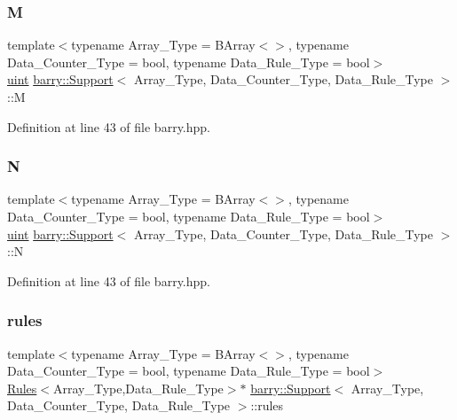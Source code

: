 \subsubsection{\texorpdfstring{M}{M}}
{\footnotesize\ttfamily template$<$typename Array\+\_\+\+Type  = B\+Array$<$$>$, typename Data\+\_\+\+Counter\+\_\+\+Type  = bool, typename Data\+\_\+\+Rule\+\_\+\+Type  = bool$>$ \\
\hyperlink{namespacebarry_a11dfc53ddb4672278319aa04f1e09a6c}{uint} \hyperlink{classbarry_1_1_support}{barry\+::\+Support}$<$ Array\+\_\+\+Type, Data\+\_\+\+Counter\+\_\+\+Type, Data\+\_\+\+Rule\+\_\+\+Type $>$\+::M}



Definition at line 43 of file barry.\+hpp.

\mbox{\label{classbarry_1_1_support_a776221deb92d113e5dee1cb100174ed4}} 
\subsubsection{\texorpdfstring{N}{N}}
{\footnotesize\ttfamily template$<$typename Array\+\_\+\+Type  = B\+Array$<$$>$, typename Data\+\_\+\+Counter\+\_\+\+Type  = bool, typename Data\+\_\+\+Rule\+\_\+\+Type  = bool$>$ \\
\hyperlink{namespacebarry_a11dfc53ddb4672278319aa04f1e09a6c}{uint} \hyperlink{classbarry_1_1_support}{barry\+::\+Support}$<$ Array\+\_\+\+Type, Data\+\_\+\+Counter\+\_\+\+Type, Data\+\_\+\+Rule\+\_\+\+Type $>$\+::N}



Definition at line 43 of file barry.\+hpp.

\mbox{\label{classbarry_1_1_support_a9311c3288f59feaece0680f9a7b630dd}} 
\subsubsection{\texorpdfstring{rules}{rules}}
{\footnotesize\ttfamily template$<$typename Array\+\_\+\+Type  = B\+Array$<$$>$, typename Data\+\_\+\+Counter\+\_\+\+Type  = bool, typename Data\+\_\+\+Rule\+\_\+\+Type  = bool$>$ \\
\hyperlink{classbarry_1_1_rules}{Rules}$<$Array\+\_\+\+Type,Data\+\_\+\+Rule\+\_\+\+Type$>$$\ast$ \hyperlink{classbarry_1_1_support}{barry\+::\+Support}$<$ Array\+\_\+\+Type, Data\+\_\+\+Counter\+\_\+\+Type, Data\+\_\+\+Rule\+\_\+\+Type $>$\+::rules}



